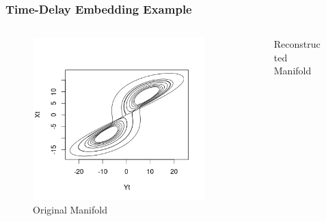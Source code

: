 \documentclass{beamer}
\theoremstyle{definition}
\begin{document}
\begin{frame}
\frametitle{Time-Delay Embedding Example}
 \begin{columns}[onlytextwidth]
   \begin{column}{0.5\textwidth}
\begin{figure}
\includegraphics[scale=.3]{XY} 
\caption{Original Manifold}
\end{figure} 
\end{column} 
 
 \begin{column}{0.5\textwidth}

\begin{figure}
\caption{Reconstructed Manifold}
\end{figure}
 \end{column}
 \end{columns}
\end{frame}
\end{document}
